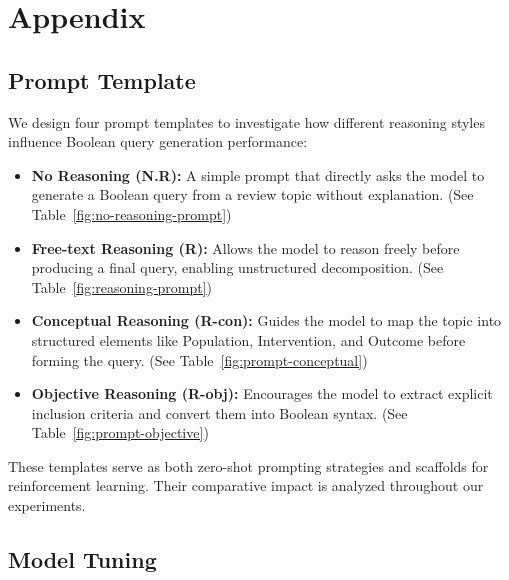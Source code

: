 
\appendix

\section{Appendix}



\subsection{Prompt Template}

We design four prompt templates to investigate how different reasoning styles influence Boolean query generation performance:

\begin{itemize}
	\item \textbf{No Reasoning (N.R):} A simple prompt that directly asks the model to generate a Boolean query from a review topic without explanation. (See Table~\ref{fig:no-reasoning-prompt})
	\item \textbf{Free-text Reasoning (R):} Allows the model to reason freely before producing a final query, enabling unstructured decomposition. (See Table~\ref{fig:reasoning-prompt})
	\item \textbf{Conceptual Reasoning (R-con):} Guides the model to map the topic into structured elements like Population, Intervention, and Outcome before forming the query. (See Table~\ref{fig:prompt-conceptual})
	\item \textbf{Objective Reasoning (R-obj):} Encourages the model to extract explicit inclusion criteria and convert them into Boolean syntax. (See Table~\ref{fig:prompt-objective})
\end{itemize}

These templates serve as both zero-shot prompting strategies and scaffolds for reinforcement learning. Their comparative impact is analyzed throughout our experiments.



\label{appendix:prompts}










\subsection{Model Tuning}
\label{appendix:training-details}

